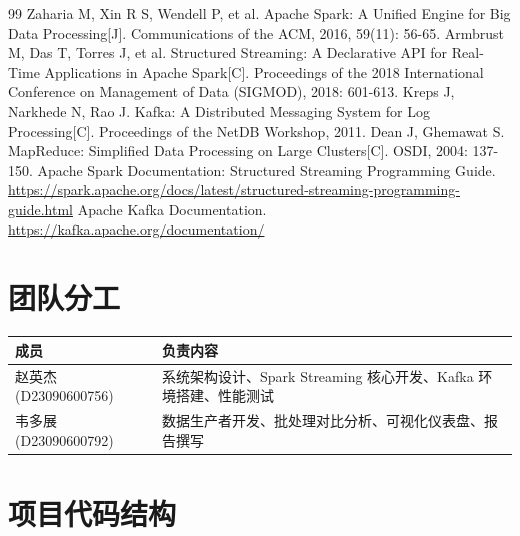 \documentclass[12pt,a4paper]{article}
\begin{document}
\begin{thebibliography}{99}
 Zaharia M, Xin R S, Wendell P, et al. Apache Spark: A Unified Engine for Big Data Processing[J]. Communications of the ACM, 2016, 59(11): 56-65.
 Armbrust M, Das T, Torres J, et al. Structured Streaming: A Declarative API for Real-Time Applications in Apache Spark[C]. Proceedings of the 2018 International Conference on Management of Data (SIGMOD), 2018: 601-613.
 Kreps J, Narkhede N, Rao J. Kafka: A Distributed Messaging System for Log Processing[C]. Proceedings of the NetDB Workshop, 2011.
 Dean J, Ghemawat S. MapReduce: Simplified Data Processing on Large Clusters[C]. OSDI, 2004: 137-150.
 Apache Spark Documentation: Structured Streaming Programming Guide. \url{https://spark.apache.org/docs/latest/structured-streaming-programming-guide.html}
 Apache Kafka Documentation. \url{https://kafka.apache.org/documentation/}
\end{thebibliography}

\appendix
\section{团队分工}

\begin{table}[H]
\centering
\begin{tabular}{lp{10cm}}
\toprule
\textbf{成员} & \textbf{负责内容} \\
\midrule
赵英杰 (D23090600756) & 系统架构设计、Spark Streaming 核心开发、Kafka 环境搭建、性能测试 \\
韦多展 (D23090600792) & 数据生产者开发、批处理对比分析、可视化仪表盘、报告撰写 \\
\bottomrule
\end{tabular}
\end{table}

\section{项目代码结构}
\end{document}
